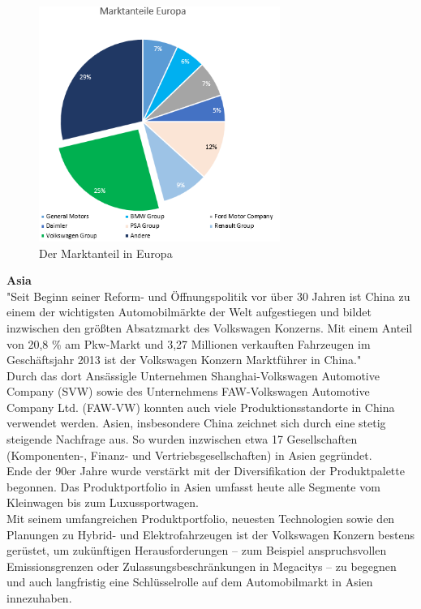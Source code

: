 \documentclass[12pt]{article}
\begin{document}
\begin{figure}[here!]
\centering
\includegraphics[width=0.7\textwidth]{images/maie}
\caption{Der Marktanteil in Europa}
\label{fig:markteuropa}
\end{figure}\FloatBarrier
\noindent
\textbf{Asia}\\
"Seit Beginn seiner Reform- und Öffnungspolitik vor über 30 Jahren ist China zu einem der wichtigsten Automobilmärkte der Welt aufgestiegen und bildet inzwischen den größten Absatzmarkt des Volkswagen Konzerns. Mit einem Anteil von 20,8 \% am Pkw-Markt und 3,27 Millionen verkauften Fahrzeugen im Geschäftsjahr 2013 ist der Volkswagen Konzern Marktführer in China."\cite{vwwebsitechina}\\
Durch das dort Ansässigle Unternehmen  Shanghai-Volkswagen Automotive Company (SVW) sowie des Unternehmens FAW-Volkswagen Automotive Company Ltd. (FAW-VW) konnten auch viele Produktionsstandorte in China verwendet werden.
Asien, insbesondere China zeichnet sich durch eine stetig steigende Nachfrage aus. So wurden inzwischen etwa 17 Gesellschaften (Komponenten-, Finanz- und Vertriebsgesellschaften) in Asien gegründet. \\
Ende der 90er Jahre wurde verstärkt mit der Diversifikation der Produktpalette begonnen. Das  Produktportfolio in Asien umfasst heute alle Segmente vom Kleinwagen bis zum Luxussportwagen.
\\
Mit seinem umfangreichen Produktportfolio, neuesten Technologien sowie den Planungen zu Hybrid- und Elektrofahrzeugen ist der Volkswagen Konzern bestens gerüstet, um zukünftigen Herausforderungen – zum Beispiel anspruchsvollen Emissionsgrenzen oder Zulassungsbeschränkungen in Megacitys – zu begegnen und auch langfristig eine Schlüsselrolle auf dem Automobilmarkt in Asien innezuhaben. \\ \\
\end{document}
